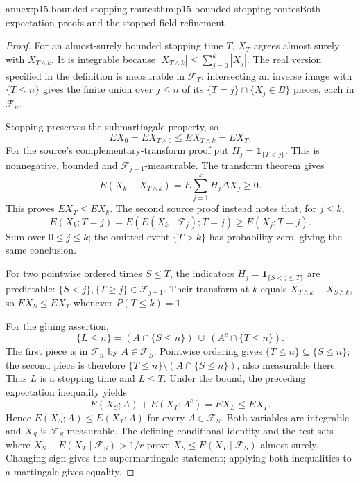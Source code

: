 
\begin{annexitem}{annex:p15.bounded-stopping-routes}{thm:p15-bounded-stopping-routes}{Both expectation proofs and the stopped-field refinement}
\begin{proof}
For an almost-surely bounded stopping time \(T\), \(X_T\) agrees
almost surely with \(X_{T\wedge k}\). It is integrable because
\(|X_{T\wedge k}|\leq\sum_{j=0}^k|X_j|\).
The real version specified in the definition is measurable in
\(\mathcal F_T\): intersecting an inverse image with \(\{T\leq n\}\)
gives the finite union over \(j\leq n\) of its
\(\{T=j\}\cap\{X_j\in B\}\) pieces, each in \(\mathcal F_n\).

Stopping preserves the submartingale property, so
\[
                        EX_0=EX_{T\wedge0}
                                  \leq EX_{T\wedge k}=EX_T.
\]
For the source's complementary-transform proof put
\(H_j=\mathbf1_{\{T<j\}}\). This is nonnegative, bounded and
\(\mathcal F_{j-1}\)-measurable. The transform theorem gives
\[
                 E(X_k-X_{T\wedge k})
                   =E\sum_{j=1}^kH_j\Delta X_j\geq0.
\]
This proves \(EX_T\leq EX_k\).
The second source proof instead notes that, for \(j\leq k\),
\[
          E(X_k;T=j)
             =E(E(X_k\mid\mathcal F_j);T=j)
             \geq E(X_j;T=j).
\]
Sum over \(0\leq j\leq k\); the omitted event \(\{T>k\}\)
has probability zero, giving the same conclusion.

For two pointwise ordered times \(S\leq T\), the indicators
\(H_j=\mathbf1_{\{S<j\leq T\}}\) are predictable:
\(\{S<j\},\{T\geq j\}\in\mathcal F_{j-1}\).
Their transform at \(k\) equals
\(X_{T\wedge k}-X_{S\wedge k}\), so \(EX_S\leq EX_T\)
whenever \(P(T\leq k)=1\).

For the gluing assertion,
\[
 \{L\leq n\}=(A\cap\{S\leq n\})\ \cup\ (A^c\cap\{T\leq n\}).
\]
The first piece is in \(\mathcal F_n\) by \(A\in\mathcal F_S\).
Pointwise ordering gives \(\{T\leq n\}\subseteq\{S\leq n\}\);
the second piece is therefore
\(\{T\leq n\}\setminus(A\cap\{S\leq n\})\), also measurable there.
Thus \(L\) is a stopping time and \(L\leq T\).
Under the bound, the preceding expectation inequality yields
\[
                 E(X_S;A)+E(X_T;A^c)=EX_L\leq EX_T.
\]
Hence \(E(X_S;A)\leq E(X_T;A)\) for every \(A\in\mathcal F_S\).
Both variables are integrable and \(X_S\) is
\(\mathcal F_S\)-measurable. The defining conditional identity and
the test sets where \(X_S-E(X_T\mid\mathcal F_S)>1/r\)
prove \(X_S\leq E(X_T\mid\mathcal F_S)\) almost surely.
Changing sign gives the supermartingale statement; applying both
inequalities to a martingale gives equality.
\end{proof}
\end{annexitem}

